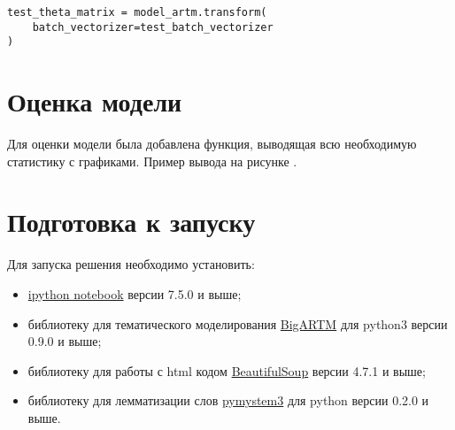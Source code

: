 \begin{lstlisting}
test_theta_matrix = model_artm.transform(
    batch_vectorizer=test_batch_vectorizer
)
\end{lstlisting}

\section{Оценка модели}

Для оценки модели была добавлена функция, выводящая всю необходимую статистику с графиками. Пример вывода на рисунке \todo{}.

%
\section{Подготовка к запуску}

Для запуска решения необходимо установить:

\begin{itemize}
    \item \href{https://ipython.readthedocs.io/en/stable/}{ipython notebook} версии 7.5.0 и выше;
    \item библиотеку для тематического моделирования \href{https://bigartm.readthedocs.io/en/stable/installation/index.html}{BigARTM} для python3 версии 0.9.0 и выше;
    \item библиотеку для работы с html кодом \href{https://www.crummy.com/software/BeautifulSoup/}{BeautifulSoup} версии 4.7.1 и выше;
    \item библиотеку для лемматизации слов \href{https://pypi.org/project/pymystem3/}{pymystem3} для python версии 0.2.0 и выше.
\end{itemize}
